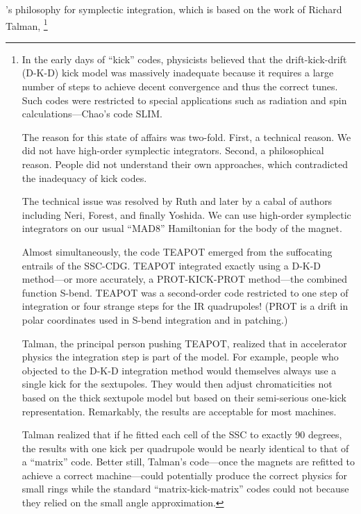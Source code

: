 %
\PTC's philosophy for symplectic integration, which is based on the work
of Richard Talman,%
\footnote{In the early days of ``kick'' codes, physicists believed that the
drift-kick-drift (D-K-D) kick model was massively inadequate because it
requires a large number of steps to achieve decent convergence and
thus the correct tunes. Such codes were restricted to special applications
such as radiation and spin calculations---Chao's code SLIM. 

The reason for this state of affairs was two-fold. First, a technical reason.
We did not have high-order symplectic integrators. Second, a philosophical
reason. People did not understand their own approaches, which
contradicted the inadequacy of kick codes.

The technical issue was resolved by Ruth and later by a cabal of authors
including Neri, Forest, and finally Yoshida. We can use high-order symplectic
integrators on our usual ``MAD8'' Hamiltonian for the body of the magnet. 

Almost simultaneously, the code TEAPOT emerged from the suffocating
entrails of the SSC-CDG. TEAPOT integrated exactly using a D-K-D
method---or more accurately, a PROT-KICK-PROT method---the combined
function S-bend. TEAPOT was a second-order code restricted to one step
of integration or four strange steps for the IR quadrupoles! (PROT is a drift
in polar coordinates used in S-bend integration and in patching.)

Talman, the principal person pushing TEAPOT, realized that in accelerator
physics the integration step is part of the model. For example, people who
objected to the D-K-D integration method would themselves always use a
single kick for the sextupoles. They would then adjust chromaticities not
based on the thick sextupole model but based on their semi-serious one-kick
representation. Remarkably, the results are acceptable for most machines. 

Talman realized that if he fitted each cell of the SSC to exactly 90 degrees,
the results with one kick per quadrupole would be nearly identical to that of
a ``matrix'' code. Better still, Talman's code---once the magnets are refitted
to achieve a correct machine---could potentially produce the correct physics
for small rings while the standard ``matrix-kick-matrix'' codes could not
because they relied on the small angle approximation.}
